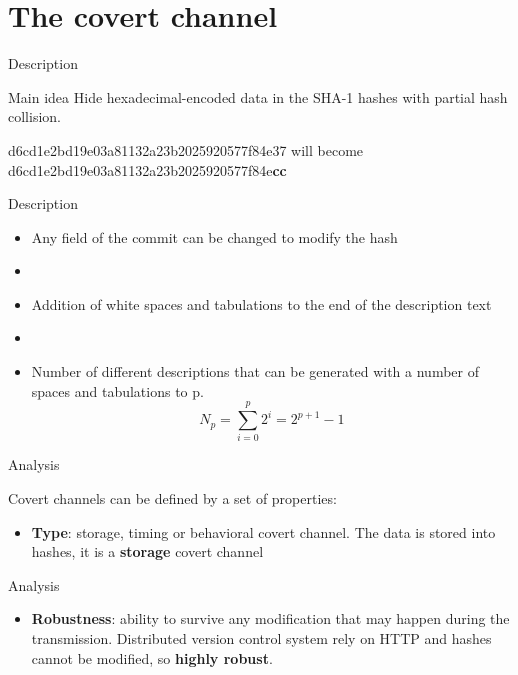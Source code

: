 \documentclass[11pt, compress]{beamer}
\begin{document}
\section{The covert channel}

\begin{frame}{Description}
\vfill
\begin{block}{Main idea}
Hide hexadecimal-encoded data in the SHA-1 hashes with partial hash collision.
\end{block}
\vfill
 d6cd1e2bd19e03a81132a23b2025920577f84e37 will become d6cd1e2bd19e03a81132a23b2025920577f84e\textbf{cc}
 \vfill

\end{frame}


\begin{frame}{Description}
\begin{itemize}
\item Any field of the commit can be changed to modify the hash
\item []
\item Addition of white spaces and tabulations to the end of the description text
\item []
\item Number of different descriptions that can be generated with a number of spaces and tabulations to p. 
\begin{equation*}
\label{eq:number_spaces}
N_p = \sum_{i=0}^{p} 2^i = 2^{p+1} - 1
\end{equation*}
\end{itemize}
\end{frame}



\begin{frame}{Analysis}

Covert channels can be defined by a set of properties:
\begin{itemize}
\item \textbf{Type}: storage, timing or behavioral covert channel.
The data is stored into hashes, it is a \textbf{storage} covert channel
\end{itemize}
\end{frame}

\begin{frame}{Analysis}
\begin{itemize}
\item \textbf{Robustness}: ability to survive any modification that may happen during the transmission. Distributed version control system rely on HTTP and hashes cannot be modified, so \textbf{highly robust}.
\end{itemize}
\end{frame}
\end{document}

